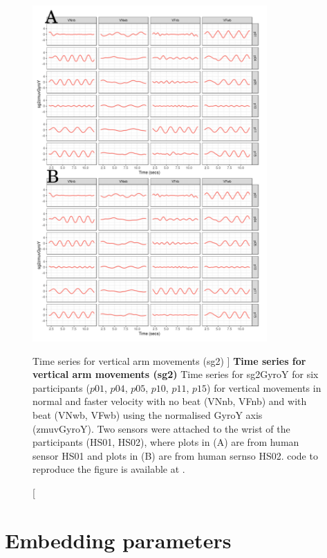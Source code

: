 \begin{figure}
\centering
\includegraphics[width=0.8\textwidth]{ts_V_sg2}
	\caption
	[Time series for vertical arm movements (sg2) ]{
	{\bf Time series for vertical arm movements (sg2)}
		Time series for sg2GyroY for six participants 
		($p01$, $p04$, $p05$, $p10$, $p11$, $p15$) 
		for vertical movements in normal and faster velocity with
		no beat	(VNnb, VFnb) and with beat (VNwb, VFwb) using 
		the normalised GyroY axis (zmuvGyroY).
		Two sensors were attached to the wrist of the participants (HS01, HS02),
		where plots in (A) are from human sensor HS01 and
		plots in (B) are from human sernso HS02.
	\R code to reproduce the figure is available at 
	.
	}
    \label{fig:tssg2gyroY-hii}
\end{figure}




\newpage
\section{Embedding parameters} \label{appendix:d:ep}

